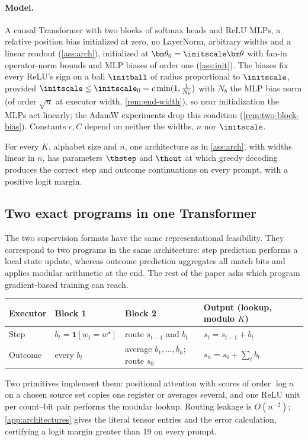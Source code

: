 \paragraph{Model.} A causal Transformer with two blocks of softmax heads and ReLU MLPs, a relative position bias
initialized at zero, no LayerNorm, arbitrary widths and a linear readout (\cref{ass:arch}), initialized at
$\bm\theta_0=\initscale\tilde{\bm\theta}$ with fan-in operator-norm bounds and MLP biases of order one (\cref{ass:init}). The biases fix
every ReLU's sign on a ball $\initball$ of radius proportional to $\initscale$, provided
$\initscale\le\initscale_0=c\min(1,\frac{1}{N_b})$ with $N_b$ the MLP bias norm (of order $\sqrt n$ at executor width, \cref{rem:end-width}), so near initialization the MLPs act linearly;
the AdamW experiments drop this condition (\cref{rem:two-block-bias}). Constants $c,C$ depend on neither the widths, $n$ nor
$\initscale$.

\begin{proposition}
\label{prop:represent}
For every $K$, alphabet size and $n$, one architecture as in \cref{ass:arch}, with widths linear in $n$, has parameters
$\thstep$ and $\thout$ at which greedy decoding produces the correct step and outcome continuations on every prompt, with
a positive logit margin.
\end{proposition}

\subsection{Two exact programs in one Transformer}
\label{sec:exact-programs}
The two supervision formats have the same representational feasibility. They correspond to two programs in the same architecture:
step prediction performs a local state update, whereas outcome prediction aggregates all match bits and applies modular arithmetic at the end.
The rest of the paper asks which program gradient-based training can reach.

\begin{center}
\small
\begin{tabular}{@{}llll@{}}
\toprule
Executor & Block 1 & Block 2 & Output (lookup, modulo $K$)\\
\midrule
Step & $b_t=\mathbf 1[w_t=w^\star]$ & route $s_{t-1}$ and $b_t$ & $s_t=s_{t-1}+b_t$\\
Outcome & every $b_t$ & average $b_1,\ldots,b_n$; route $s_0$ & $s_n=s_0+\sum_tb_t$\\
\bottomrule
\end{tabular}
\end{center}
Two primitives implement them: positional attention with scores of order $\log n$ on a chosen source set copies one register or
averages several, and one ReLU unit per count--bit pair performs the modular lookup. Routing leakage is $O(n^{-2})$;
\cref{app:architectures} gives the literal tensor entries and the error calculation, certifying a logit margin greater than $19$ on every
prompt.

